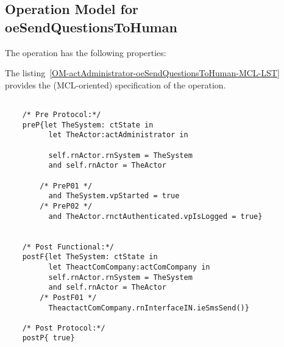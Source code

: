 \subsection{Operation Model for oeSendQuestionsToHuman}

\label{OM-oeSendQuestionsToHuman}


The  operation has the following properties:

	\begin{operationmodel}



		


	\end{operationmodel}



	\vspace{1cm}
	The listing~\ref{OM-actAdministrator-oeSendQuestionsToHuman-MCL-LST} provides the \msrmessir (MCL-oriented) specification of the operation.
	
	\scriptsize
	\vspace{0.5cm}
	\begin{lstlisting}[style=MessirStyle,firstnumber=auto,captionpos=b,caption={\msrmessir (MCL-oriented) specification of the operation \emph{oeSendQuestionsToHuman}.},label=OM-actAdministrator-oeSendQuestionsToHuman-MCL-LST]

	/* Pre Protocol:*/ 
	preP{let TheSystem: ctState in
		  let TheActor:actAdministrator in
		  
		  self.rnActor.rnSystem = TheSystem
		  and self.rnActor = TheActor
		  
		/* PreP01 */
		  and TheSystem.vpStarted = true
		/* PreP02 */
		  and TheActor.rnctAuthenticated.vpIsLogged = true}
	
	
	/* Post Functional:*/ 
	postF{let TheSystem: ctState in
		  let TheactComCompany:actComCompany in
		  self.rnActor.rnSystem = TheSystem
		  and self.rnActor = TheActor
		/* PostF01 */
		  TheactactComCompany.rnInterfaceIN.ieSmsSend()}
	
	/* Post Protocol:*/ 
	postP{ true}
	
	\end{lstlisting}
	\normalsize 
	
	
	
	





